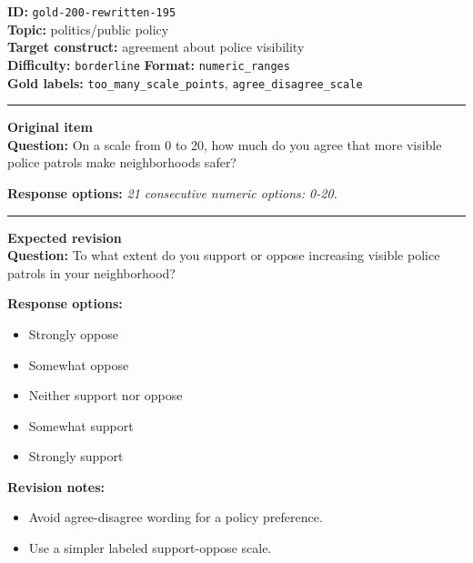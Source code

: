 \documentclass[10pt,a4paper]{article}
\newcommand{\sectionline}{\vspace{0.15em}\hrule\vspace{0.35em}}
\begin{document}
\begin{tcolorbox}[colframe=FlawRed,colback=white,colbacktitle=FlawRed!9,coltitle=black,title={Item 195\hfill Flawed item}]
\textbf{ID:} \texttt{gold-200-rewritten-195}\\
\textbf{Topic:} politics/public policy\\
\textbf{Target construct:} agreement about police visibility\\
\textbf{Difficulty:} \texttt{borderline} \quad \textbf{Format:} \texttt{numeric\_ranges}\\
\textbf{Gold labels:} \texttt{too\_many\_scale\_points}, \texttt{agree\_disagree\_scale}\\
\sectionline
\textbf{Original item}\\
\textbf{Question:} On a scale from 0 to 20, how much do you agree that more visible police patrols make neighborhoods safer?
\par\textbf{Response options:}
\textit{21 consecutive numeric options: 0-20.}
\sectionline
\textbf{Expected revision}\\
\textbf{Question:} To what extent do you support or oppose increasing visible police patrols in your neighborhood?
\par\textbf{Response options:}
\begin{itemize}
\item Strongly oppose
\item Somewhat oppose
\item Neither support nor oppose
\item Somewhat support
\item Strongly support
\end{itemize}
\par\textbf{Revision notes:}
\begin{itemize}
\item Avoid agree-disagree wording for a policy preference.
\item Use a simpler labeled support-oppose scale.
\end{itemize}
\end{tcolorbox}
\end{document}
